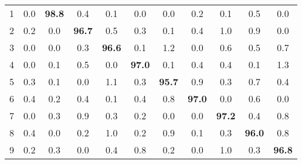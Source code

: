 \documentclass{article}
\begin{document}
\begin{table}[hbt!]
\begin{subtable}{0.5\linewidth}
\begin{tabular}{c| c c c c c c c c c c |}
            1 & 0.0 & \textbf{98.8} & 0.4 & 0.1 & 0.0 & 0.0 & 0.2 & 0.1 & 0.5 & 0.0 \\
            2 & 0.2 & 0.0 & \textbf{96.7} & 0.5 & 0.3 & 0.1 & 0.4 & 1.0 & 0.9 & 0.0 \\
            3 & 0.0 & 0.0 & 0.3 & \textbf{96.6} & 0.1 & 1.2 & 0.0 & 0.6 & 0.5 & 0.7 \\
            4 & 0.0 & 0.1 & 0.5 & 0.0 & \textbf{97.0} & 0.1 & 0.4 & 0.4 & 0.1 & 1.3 \\
            5 & 0.3 & 0.1 & 0.0 & 1.1 & 0.3 & \textbf{95.7} & 0.9 & 0.3 & 0.7 & 0.4 \\
            6 & 0.4 & 0.2 & 0.4 & 0.1 & 0.4 & 0.8 & \textbf{97.0} & 0.0 & 0.6 & 0.0 \\
            7 & 0.0 & 0.3 & 0.9 & 0.3 & 0.2 & 0.0 & 0.0 & \textbf{97.2} & 0.4 & 0.8 \\
            8 & 0.4 & 0.0 & 0.2 & 1.0 & 0.2 & 0.9 & 0.1 & 0.3 & \textbf{96.0} & 0.8 \\
            9 & 0.2 & 0.3 & 0.0 & 0.4 & 0.8 & 0.2 & 0.0 & 1.0 & 0.3 & \textbf{96.8}
        \end{tabular}
         \label{tab:mnist2}
  \end{subtable}
  \vspace{-3mm}
\end{table}
\end{document}
